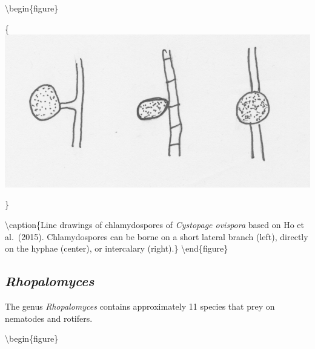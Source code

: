 \documentclass[]{book}
\begin{document}
\textbackslash begin\{figure\}

\{\centering \includegraphics[width=11.09in]{img/Ch3_Fig5}

\}

\textbackslash caption\{Line drawings of chlamydospores of \emph{Cystopage ovispora} based on Ho et al.~(2015). Chlamydospores can be borne on a short lateral branch (left), directly on the hyphae (center), or intercalary (right).\}\label{fig:ch3fig5}
\textbackslash end\{figure\}

\hypertarget{rhopalomyces}{%
\subsection{\texorpdfstring{\emph{Rhopalomyces}}{Rhopalomyces}}\label{rhopalomyces}}

The genus \emph{Rhopalomyces} contains approximately 11 species that prey on nematodes and rotifers.

\textbackslash begin\{figure\}
\end{document}
